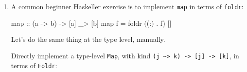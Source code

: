 \documentclass[]{article}
\newenvironment{Shaded}{}{}
\newcommand{\CommentTok}[1]{\textcolor[rgb]{0.38,0.63,0.69}{\textit{#1}}}
\newcommand{\DataTypeTok}[1]{\textcolor[rgb]{0.56,0.13,0.00}{#1}}
\newcommand{\DecValTok}[1]{\textcolor[rgb]{0.25,0.63,0.44}{#1}}
\newcommand{\FunctionTok}[1]{\textcolor[rgb]{0.02,0.16,0.49}{#1}}
\newcommand{\KeywordTok}[1]{\textcolor[rgb]{0.00,0.44,0.13}{\textbf{#1}}}
\newcommand{\NormalTok}[1]{#1}
\newcommand{\OtherTok}[1]{\textcolor[rgb]{0.00,0.44,0.13}{#1}}
\renewcommand{\href}[2]{#2\footnote{\url{#1}}}
\begin{document}
\begin{enumerate}
  Write a similar type \texttt{IsOdd\ n} that can only be constructed if
  \texttt{n} is \emph{odd}.

\begin{Shaded}
\begin{Highlighting}[]
\KeywordTok{type} \DataTypeTok{IsOdd}\NormalTok{ n }\FunctionTok{=} \DataTypeTok{Sigma} \DataTypeTok{Nat}\NormalTok{ (}\FunctionTok{????}\NormalTok{ n)}
\end{Highlighting}
\end{Shaded}

  And construct a proof that \texttt{7} is odd:

\begin{Shaded}
\begin{Highlighting}[]
\CommentTok{-- source: https://github.com/mstksg/inCode/tree/master/code-samples/singletons/Door4Final.hs#L226-L226}

\OtherTok{sevenIsOdd ::} \DataTypeTok{IsOdd} \DecValTok{7}
\end{Highlighting}
\end{Shaded}

  \href{https://github.com/mstksg/inCode/tree/master/code-samples/singletons/Door4Final.hs\#L220-L220}{Solution
  here!}

  On a sad note, one exercise I'd like to be able to add is to ask you to write
  decision functions and proofs for \texttt{IsEven} and \texttt{IsOdd}.
  Unfortunately, \texttt{Nat} is not rich enough to support this out of the box
  without a lot of extra tooling!
\item
  A common beginner Haskeller exercise is to implement \texttt{map} in terms of
  \texttt{foldr}:

\begin{Shaded}
\begin{Highlighting}[]
\NormalTok{map}\OtherTok{ ::}\NormalTok{ (a }\OtherTok{->}\NormalTok{ b) }\OtherTok{->}\NormalTok{ [a] _}\FunctionTok{>}\NormalTok{ [b]}
\NormalTok{map f }\FunctionTok{=}\NormalTok{ foldr ((}\FunctionTok{:}\NormalTok{) }\FunctionTok{.}\NormalTok{ f) []}
\end{Highlighting}
\end{Shaded}

  Let's do the same thing at the type level, manually.

  Directly implement a type-level \texttt{Map}, with kind
  \texttt{(j\ \textasciitilde{}\textgreater{}\ k)\ -\textgreater{}\ {[}j{]}\ -\textgreater{}\ {[}k{]}},
  in terms of \texttt{Foldr}:


\end{enumerate}
\end{document}
